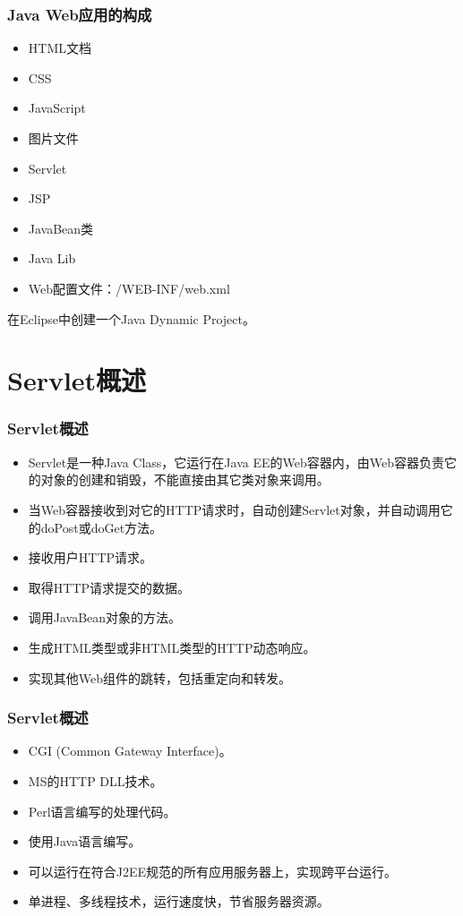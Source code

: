 \begin{frame}
\frametitle{Java Web应用的构成} 
\begin{itemize}
\item HTML文档
\item CSS
\item JavaScript
\item 图片文件
\item Servlet
\item JSP
\item JavaBean类
\item Java Lib
\item Web配置文件：/WEB-INF/web.xml
\end{itemize}

 在Eclipse中创建一个Java Dynamic Project。
\end{frame}


\section{Servlet概述}

\begin{frame}
\frametitle{Servlet概述}
\begin{itemize}
\item Servlet是一种Java Class，它运行在Java EE的Web容器内，由Web容器负责它的对象的创建和销毁，不能直接由其它类对象来调用。
\item 当Web容器接收到对它的HTTP请求时，自动创建Servlet对象，并自动调用它的doPost或doGet方法。
\end{itemize}

\begin{itemize}
\item 接收用户HTTP请求。
\item 取得HTTP请求提交的数据。
\item 调用JavaBean对象的方法。
\item 生成HTML类型或非HTML类型的HTTP动态响应。
\item 实现其他Web组件的跳转，包括重定向和转发。
\end{itemize}
\end{frame}

\begin{frame}
\frametitle{Servlet概述}
\begin{itemize}
\item CGI (Common Gateway Interface)。
\item MS的HTTP DLL技术。
\item Perl语言编写的处理代码。
\end{itemize}

\begin{itemize}
\item 使用Java语言编写。
\item 可以运行在符合J2EE规范的所有应用服务器上，实现跨平台运行。
\item 单进程、多线程技术，运行速度快，节省服务器资源。
\end{itemize}
\end{frame}

